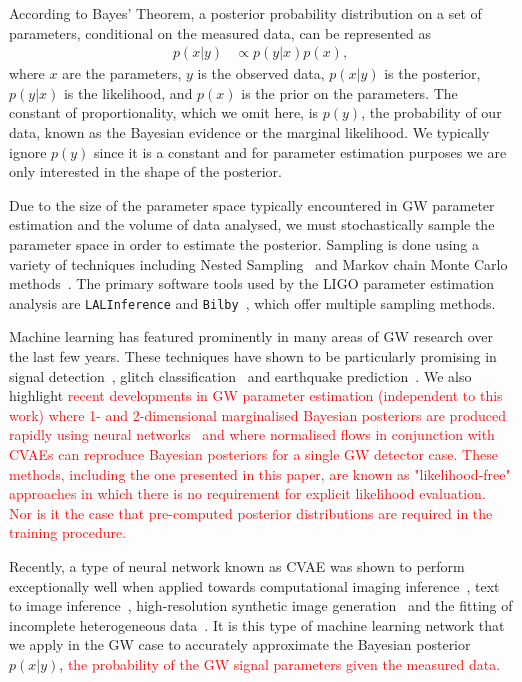 \documentclass[%
showpacs,
 amsmath,amssymb,
 aps,
 twocolumn,
 prl,
 reprint,
floatfix,
]{revtex4-1}
\newcommand{\new}[1]{\textcolor{red}{#1}}
\begin{document}
%
%
According to Bayes' Theorem, a posterior probability distribution on a set of
parameters, conditional on the measured data, can be represented as
%
\begin{align}\label{eq:bayes_theorem} 
p(x|y) &\propto p(y|x) p(x), 
\end{align}
%
where $x$ are the parameters, $y$ is the observed data, $p(x|y)$ is the
posterior, $p(y|x)$ is the likelihood, and $p(x)$ is the prior on the
parameters. The constant of proportionality, which we omit here, is
$p(y)$, the probability of our data, known as the Bayesian evidence or the
marginal likelihood. We typically ignore $p(y)$ since it is a constant and for
parameter estimation purposes we are only interested in the shape of the
posterior.

%
%
Due to the size of the parameter space typically encountered in \ac{GW}
parameter estimation and the volume of data analysed, we must stochastically
sample the parameter space in order to estimate the posterior.  Sampling is
done using a variety of techniques including Nested
Sampling~\cite{skilling2006,cpnest,dynesty} and Markov chain Monte Carlo
methods~\cite{emcee,ptemcee}. The primary software tools used by the \ac{LIGO}
parameter estimation analysis are \texttt{LALInference} and
\texttt{Bilby}~\cite{1409.7215,1811.02042}, which offer multiple sampling
methods.  
  
%
%
Machine learning has featured prominently in many areas of \ac{GW} research
over the last few years. These techniques have shown to be particularly
promising in signal
detection~\cite{GEORGE201864,PhysRevLett.120.141103,GebKilParHarSch}, glitch
classification~\cite{0264-9381-34-6-064003} and earthquake
prediction~\cite{Coughlin_2017}. We also highlight \new{recent developments in
\ac{GW} parameter estimation (independent to this work) where 1- and
2-dimensional marginalised Bayesian posteriors are produced rapidly using
neural networks~\cite{2019arXiv190905966C} and where normalised flows in
conjunction with \acp{CVAE} can reproduce Bayesian posteriors for a single
\ac{GW} detector case. These methods, including the one presented in this
paper, are known as "likelihood-free" approaches in which there is no
requirement for explicit likelihood evaluation. Nor is it the case that
pre-computed posterior distributions are required in the training procedure.}

%
%
Recently, a type of neural network known as \ac{CVAE} was shown to perform
exceptionally well when applied towards computational imaging
inference~\cite{1904.06264,NIPS2015_5775}, text to image
inference~\cite{1512.00570}, high-resolution synthetic image
generation~\cite{1612.00005} and the fitting of incomplete heterogeneous
data~\cite{1807.03653}. It is this type of machine learning network that we
apply in the \ac{GW} case to accurately approximate the Bayesian posterior
$p(x|y)$, \new{the probability of the \ac{GW} signal parameters given the
measured data.} 
\end{document}
